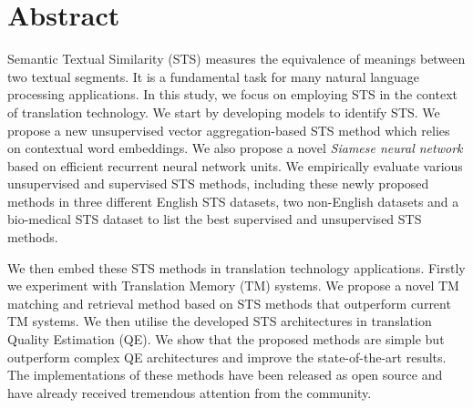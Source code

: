 
\chapter*{Abstract}
Semantic Textual Similarity (STS) measures the equivalence of meanings between two textual segments. It is a fundamental task for many natural language processing applications. In this study, we focus on employing STS in the context of translation technology. We start by developing models to identify STS. We propose a new unsupervised vector aggregation-based STS method which relies on contextual word embeddings. We also propose a novel \textit{Siamese neural network} based on efficient recurrent neural network units. We empirically evaluate various unsupervised and supervised STS methods, including these newly proposed methods in three different English STS datasets, two non-English datasets and a bio-medical STS dataset to list the best supervised and unsupervised STS methods.

We then embed these STS methods in translation technology applications. Firstly we experiment with Translation Memory (TM) systems. We propose a novel TM matching and retrieval method based on STS methods that outperform current TM systems. We then utilise the developed STS architectures in translation Quality Estimation (QE). We show that the proposed methods are simple but outperform complex QE architectures and improve the state-of-the-art results. The implementations of these methods have been released as open source and have already received tremendous attention from the community.



